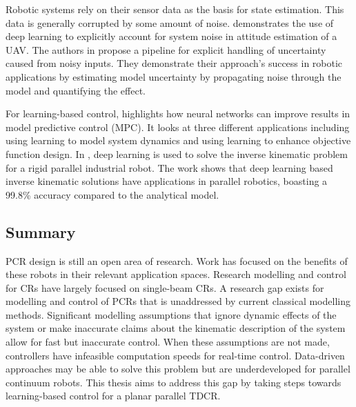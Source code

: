 Robotic systems rely on their sensor data as the basis for state estimation. This data is generally corrupted by some amount of noise. \cite{8643440} demonstrates the use of deep learning to explicitly account for system noise in attitude estimation of a UAV. The authors in \cite{9001195} propose a pipeline for explicit handling of uncertainty caused from noisy inputs. They demonstrate their approach's success in robotic applications by estimating model uncertainty by propagating noise through the model and quantifying the effect. 

For learning-based control, \cite{doi:10.1146/annurev-control-090419-075625} highlights how neural networks can improve results in model predictive control (MPC). It looks at three different applications including using learning to model system dynamics and using learning to enhance objective function design. In \cite{TOQUICA2021106682}, deep learning is used to solve the inverse kinematic problem for a rigid parallel industrial robot. The work shows that deep learning based inverse kinematic solutions have applications in parallel robotics, boasting a 99.8\% accuracy compared to the analytical model. 


\subsection{Summary}
PCR design is still an open area of research. Work has focused on the benefits of these robots in their relevant application spaces. Research modelling and control for CRs have largely focused on single-beam CRs. A research gap exists for modelling and control of PCRs that is unaddressed by current classical modelling methods. Significant modelling assumptions that ignore dynamic effects of the system or make inaccurate claims about the kinematic description of the system allow for fast but inaccurate control. When these assumptions are not made, controllers have infeasible computation speeds for real-time control. Data-driven approaches may be able to solve this problem but are underdeveloped for parallel continuum robots. This thesis aims to address this gap by taking steps towards learning-based control for a planar parallel TDCR. 